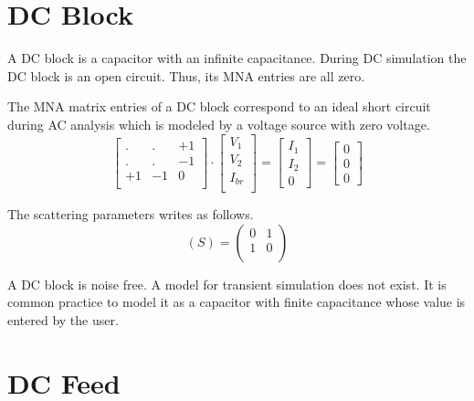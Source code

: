 \section{DC Block}

A DC block is a capacitor with an infinite capacitance. During DC
simulation the DC block is an open circuit. Thus, its MNA
entries are all zero.

\addvspace{12pt}

The MNA matrix entries of a DC block correspond to an ideal short
circuit during AC analysis which is modeled by a voltage source with
zero voltage.
\begin{equation}
\begin{bmatrix}
. & . & +1\\
. & . & -1\\
+1 & -1 & 0\\
\end{bmatrix}
\cdot
\begin{bmatrix}
V_1\\
V_2\\
I_{br}\\
\end{bmatrix}
=
\begin{bmatrix}
I_1\\
I_2\\
0
\end{bmatrix}
=
\begin{bmatrix}
0\\
0\\
0
\end{bmatrix}
\end{equation}

The scattering parameters writes as follows.
\begin{equation}
(S) =
\begin{pmatrix}
0 & 1\\
1 & 0\\
\end{pmatrix}
\end{equation}

A DC block is noise free. A model for transient simulation does not
exist. It is common practice to model it as a capacitor with finite
capacitance whose value is entered by the user.


\section{DC Feed}

